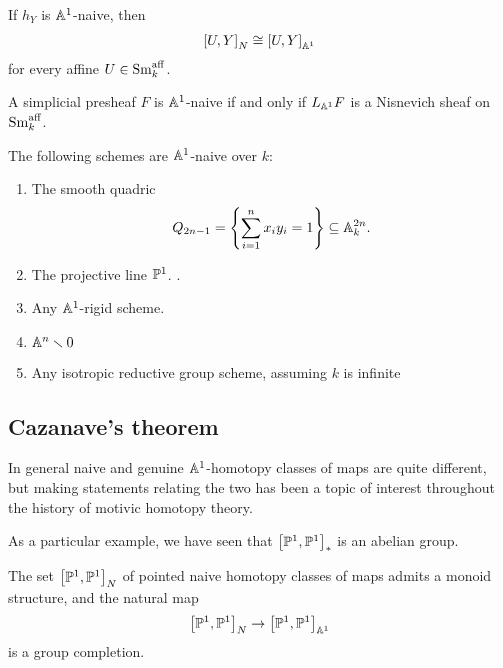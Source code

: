 \documentclass[11pt,openany]{book}
\providecommand{\aff}{\mathrm{aff}}
\begin{document}
\begin{proposition} If $h_Y$ is $\A^1$-naive, then
\begin{align*}
    \left[ U,Y \right]_N \cong \left[ U,Y \right]_{\A^1}
\end{align*}
for every affine $U \in \Sm_k^\aff$.
\end{proposition}




\begin{proposition} \cite[2.1.3]{AHW2}
A simplicial presheaf $F$ is $\A^1$-naive if and only if $L_{\A^1} F$ is a Nisnevich sheaf on $\Sm_k^\aff$.
\end{proposition}

\begin{example} The following schemes are $\A^1$-naive over $k$:
\begin{enumerate}
    \item The smooth quadric \cite[4.2.1]{AHW2}
    \begin{align*}
        Q_{2n-1} = \left\{ \sum_{i=1}^n x_i y_i =1 \right\} \subseteq \A_k^{2n}.
    \end{align*}
    
    \item The projective line $\P^1$. \cite[127]{BHQW}.

    \item Any $\A^1$-rigid scheme.

    \item $\A^n \minus 0$ \cite[4.2.6]{AHW2}

    \item Any isotropic reductive group scheme, assuming $k$ is infinite \cite[4.3.1]{AHW2}
\end{enumerate}
\end{example}



\subsection{Cazanave's theorem}

In general naive and genuine $\A^1$-homotopy classes of maps are quite different, but making statements relating the two has been a topic of interest throughout the history of motivic homotopy theory.

As a particular example, we have seen that $\left[ \P^1,\P^1 \right]_\ast$ is an abelian group. 

\begin{theorem} The set $\left[ \P^1,\P^1 \right]_N$ of pointed naive homotopy classes of maps admits a monoid structure, and the natural map
\begin{align*}
    \left[ \P^1,\P^1 \right]_N \to \left[ \P^1,\P^1 \right]_{\A^1}
\end{align*}
is a group completion.
\end{theorem}
\end{document}
